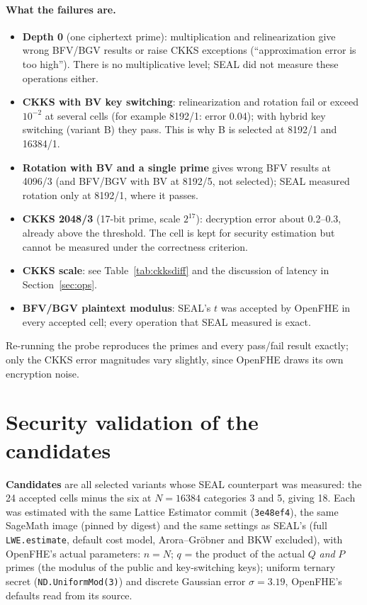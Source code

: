 \documentclass[11pt]{article}
\begin{document}
\paragraph{What the failures are.}
\begin{itemize}[leftmargin=*, itemsep=2pt]
  \item \textbf{Depth 0} (one ciphertext prime): multiplication and relinearization give wrong BFV/BGV results or raise CKKS exceptions (``approximation error is too high''). There is no multiplicative level; SEAL did not measure these operations either.
  \item \textbf{CKKS with BV key switching}: relinearization and rotation fail or exceed $10^{-2}$ at several cells (for example 8192/1: error 0.04); with hybrid key switching (variant B) they pass. This is why B is selected at 8192/1 and 16384/1.
  \item \textbf{Rotation with BV and a single prime} gives wrong BFV results at 4096/3 (and BFV/BGV with BV at 8192/5, not selected); SEAL measured rotation only at 8192/1, where it passes.
  \item \textbf{CKKS 2048/3} (17-bit prime, scale $2^{17}$): decryption error about 0.2--0.3, already above the threshold. The cell is kept for security estimation but cannot be measured under the correctness criterion.
  \item \textbf{CKKS scale}: see Table~\ref{tab:ckksdiff} and the discussion of latency in Section~\ref{sec:ops}.
  \item \textbf{BFV/BGV plaintext modulus}: SEAL's $t$ was accepted by OpenFHE in every accepted cell; every operation that SEAL measured is exact.
\end{itemize}
Re-running the probe reproduces the primes and every pass/fail result exactly; only the CKKS error magnitudes vary slightly, since OpenFHE draws its own encryption noise.

\section{Security validation of the candidates}
\label{sec:sec}

\textbf{Candidates} are all selected variants whose SEAL counterpart was measured: the 24 accepted cells minus the six at $N{=}16384$ categories 3 and 5, giving 18. Each was estimated with the same Lattice Estimator commit (\texttt{3e48ef4}), the same SageMath image (pinned by digest) and the same settings as SEAL's (full \texttt{LWE.estimate}, default cost model, Arora--Gr\"obner and BKW excluded), with OpenFHE's actual parameters: $n = N$; $q$ = the product of the actual $Q$ \emph{and} $P$ primes (the modulus of the public and key-switching keys); uniform ternary secret (\texttt{ND.UniformMod(3)}) and discrete Gaussian error $\sigma = 3.19$, OpenFHE's defaults read from its source.
\end{document}

